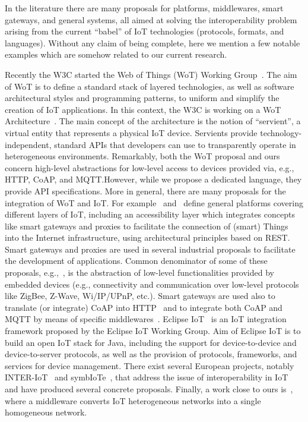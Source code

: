 In the literature there are many proposals for platforms, middlewares, smart
gateways, and general systems, all aimed at solving the interoperability
problem arising from the current ``babel'' of IoT technologies (protocols,
formats, and languages). Without any claim of being complete, here we mention a
few notable examples which are somehow related to our current research.

Recently the W3C started the Web of Things (WoT) Working Group~\cite{w3c17}. The
aim of WoT is to define a standard stack of layered technologies, as well as
software architectural styles and programming patterns, to uniform and simplify
the creation of IoT applications. In this context, the W3C is working on a WoT
Architecture~\cite{wot.arch}. The main concept of the architecture is the notion
of ``servient'', a virtual entity that represents a physical IoT device.
Servients provide technology-independent, standard APIs that developers can use
to transparently operate in heterogeneous environments. Remarkably, both the
WoT proposal and ours concern high-level
abstractions for low-level access to devices provided via, e.g., HTTP, CoAP, and
MQTT.\@ However, while we propose a dedicated language, they provide API
specifications.
%
More in general, there are many proposals for the integration of WoT and IoT.\@
For example~\cite{dominique2011web} and~\cite{corredor2014lightweight} define
general platforms covering different layers of IoT, including an accessibility
layer which integrates concepts like smart gateways and proxies to facilitate
the connection of (smart) Things into the Internet infrastructure, using
architectural principles based on REST.
%
Smart gateways and proxies are used in several industrial proposals to
facilitate the development of applications. Common denominator of some of these
proposals, e.g.,~\cite{60, 61, 62}, is the abstraction of low-level
functionalities provided by embedded devices (e.g., connectivity and
communication over low-level protocols like ZigBee, Z-Wave, Wi/IP/UPnP, etc.).
Smart gateways are used also to translate (or integrate) CoAP into
HTTP~\cite{7811451,s150101217,7037719} and to integrate both CoAP and MQTT by
means of specific middlewares~\cite{6827678}. Eclipse IoT~\cite{EplicseIoT} is
an IoT integration framework proposed by the Eclipse IoT Working Group. Aim of
Eclipse IoT is to build an open IoT stack for Java, including the support for
device-to-device and device-to-server protocols, as well as the provision of
protocols, frameworks, and services for device management. There exist several
 European projects, notably INTER-IoT~\cite{7471373} and
symbIoTe~\cite{Gojmerac16}, that address the issue of interoperability in IoT
and have produced several concrete proposals. Finally, a work close to ours
is~\cite{Zhiliang11}, where a middleware converts IoT heterogeneous networks
into a single homogeneous network.

